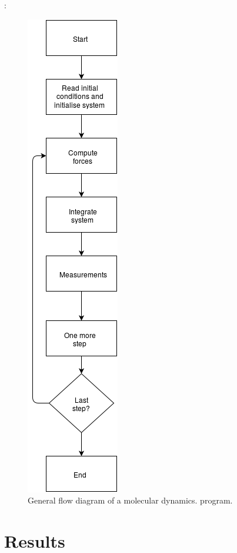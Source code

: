 \documentclass{beamer}
\begin{document}
			\begin{frame}{\secname : \subsecname}
				\begin{figure}[ht!]\begin{center}\includegraphics[scale=0.25]{MD.png}\par\protect\caption{General flow diagram of a molecular dynamics. program.}\end{center}\end{figure}
			\end{frame}
		
	\section{Results}
\end{document}
